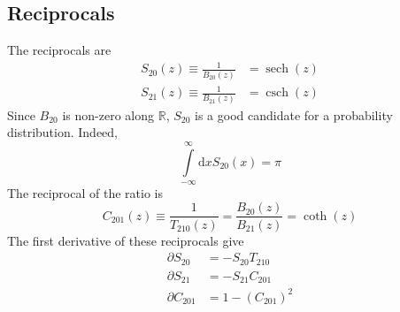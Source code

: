\subsection{Reciprocals}
The reciprocals are
\begin{align}
    S_{20}(z) \equiv \frac{1}{B_{20}(z)} &= \operatorname{sech}(z) \\
    S_{21}(z) \equiv \frac{1}{B_{21}(z)} &= \operatorname{csch}(z)
\end{align}
Since $B_{20}$ is non-zero along $\mathbb{R}$, $S_{20}$ is a good candidate for a probability distribution. Indeed,
\begin{equation}
    \int\limits_{-\infty}^{\infty} \mathrm{d}x S_{20}(x) = \pi
\end{equation}
The reciprocal of the ratio is
\begin{equation}
    C_{201}(z) \equiv \frac{1}{T_{210}(z)} = \frac{B_{20}(z)}{B_{21}(z)} = \operatorname{coth}(z)
\end{equation}
The first derivative of these reciprocals give
\begin{align}
    \partial S_{20} &= -S_{20} T_{210} \\
    \partial S_{21} &= -S_{21} C_{201} \\
    \partial C_{201} &= 1 - \left( C_{201} \right)^{2}
\end{align}